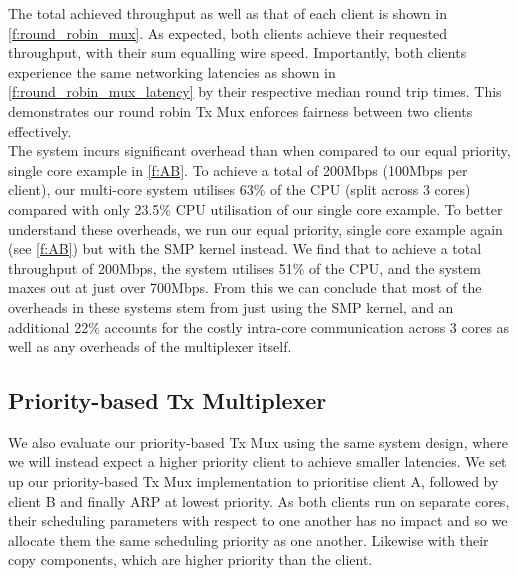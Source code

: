 The total achieved throughput as well as that of each client is shown in \autoref{f:round_robin_mux}. As expected, both clients achieve their 
requested throughput, with their sum equalling wire speed. Importantly, both clients experience the same networking latencies as shown
in \autoref{f:round_robin_mux_latency} by their respective median round trip times. This demonstrates our round robin Tx Mux enforces
fairness between two clients effectively.\\

The system incurs significant overhead than when compared to our equal priority, single core example in \autoref{f:AB}. To
achieve a total of 200Mbps (100Mbps per client), our multi-core system utilises 63\% of the CPU (split across 3 cores) compared with 
only 23.5\% CPU utilisation of our single core example. To better understand these overheads, we run our equal priority, 
single core example again (see \autoref{f:AB}) but with the SMP kernel instead. We find that to achieve
a total throughput of 200Mbps, the system utilises 51\% of the CPU, and the system maxes out at just over 700Mbps. 
From this we can conclude that most of the overheads in these systems stem 
from just using the SMP kernel, and an additional 22\% accounts for the costly intra-core communication across 3 cores as 
well as any overheads of the multiplexer itself.

\subsection{Priority-based Tx Multiplexer}

We also evaluate our priority-based Tx Mux using the same system design, where we will instead expect a higher priority client to achieve smaller
latencies. We set up our priority-based Tx Mux implementation to prioritise client A, followed by client B and finally ARP at lowest priority.
As both clients run on separate cores, their scheduling parameters with respect to one another has no impact and so we allocate them the same
scheduling priority as one another. Likewise with their copy components, which are higher priority than the client. 

